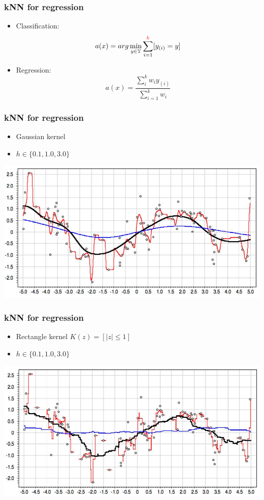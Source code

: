 \documentclass[default]{beamer}
\begin{document}
	\begin{frame}
		\frametitle{kNN for regression}

		\begin{itemize}
			\item Classification:
				\[
				a(x)=arg\min_{y\in\mathbb Y}\sum_{i=1}^{\textcolor{red}{k}}[y_{(i)}=y]
				\]
			\item Regression:
				\[
					a(x)=\frac{\sum_i^k w_iy_{(i)}}{\sum_{i=1}^k w_i}
				\]
		\end{itemize}
	\end{frame}
	\begin{frame}
		\frametitle{kNN for regression}
		
		\begin{itemize}
			\item Gaussian kernel
			\item $h\in\{0.1,1.0,3.0\}$
		\end{itemize}
		\centering
		\includegraphics[width=\textwidth]{linear_7.jpg}
	\end{frame}

	\begin{frame}
		\frametitle{kNN for regression}
		
		\begin{itemize}
			\item Rectangle kernel $K(z)=[|z|\leq 1]$
			\item $h\in\{0.1,1.0,3.0\}$
		\end{itemize}
		\centering
		\includegraphics[width=\textwidth]{linear_8.jpg}
	\end{frame}
\end{document}
